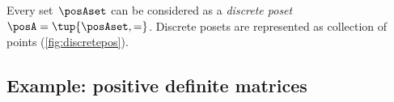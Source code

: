 \begin{example}
    \label{ex:discreteposet}
    Every set~$\posAset$ can be considered as a \emph{discrete poset}~$\posA = \tup{\posAset,=}$.
    Discrete posets are represented as collection of points (\cref{fig:discretepos}).
\end{example}

\newcommand{\fitinmargin}[1]{%
    \maxsizebox{\marginparwidth}{!}{#1}%
}

\newcommand{\fitinline}[1]{%
    \maxsizebox{\textwidth}{!}{#1}%
}


\subsection{Example: positive definite matrices}

\begin{marginfigure}
    \centering

    \caption{}
    \label{fig:posdef}
\end{marginfigure}

